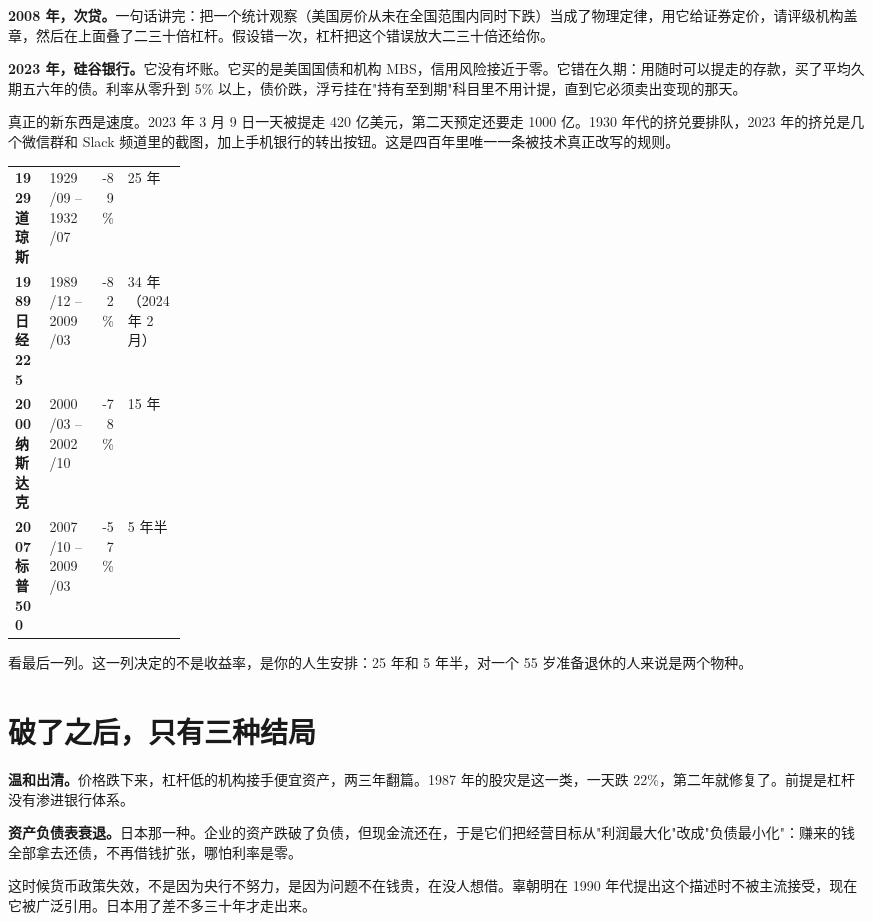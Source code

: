 \textbf{2008 年，次贷。}一句话讲完：把一个统计观察（美国房价从未在全国范围内同时下跌）当成了物理定律，用它给证券定价，请评级机构盖章，然后在上面叠了二三十倍杠杆。假设错一次，杠杆把这个错误放大二三十倍还给你。

\textbf{2023 年，硅谷银行。}它没有坏账。它买的是美国国债和机构 MBS，信用风险接近于零。它错在久期：用随时可以提走的存款，买了平均久期五六年的债。利率从零升到 5\% 以上，债价跌，浮亏挂在"持有至到期"科目里不用计提，直到它必须卖出变现的那天。

真正的新东西是速度。2023 年 3 月 9 日一天被提走 420 亿美元，第二天预定还要走 1000 亿。1930 年代的挤兑要排队，2023 年的挤兑是几个微信群和 Slack 频道里的截图，加上手机银行的转出按钮。这是四百年里唯一一条被技术真正改写的规则。

\begin{tablewrap}
\begin{xltabular}{\linewidth}{>{\raggedright\arraybackslash}p{0.20\linewidth}XrX}
\toprule
{} &  &  &  \\
\midrule
\textbf{1929 道琼斯} & 1929/09 – 1932/07 & -89\% & 25 年 \\
\textbf{1989 日经 225} & 1989/12 – 2009/03 & -82\% & 34 年（2024 年 2 月） \\
\textbf{2000 纳斯达克} & 2000/03 – 2002/10 & -78\% & 15 年 \\
\textbf{2007 标普 500} & 2007/10 – 2009/03 & -57\% & 5 年半 \\
\bottomrule
\end{xltabular}
\end{tablewrap}

看最后一列。这一列决定的不是收益率，是你的人生安排：25 年和 5 年半，对一个 55 岁准备退休的人来说是两个物种。

\bookbreak

\section{破了之后，只有三种结局}

\textbf{温和出清。}价格跌下来，杠杆低的机构接手便宜资产，两三年翻篇。1987 年的股灾是这一类，一天跌 22\%，第二年就修复了。前提是杠杆没有渗进银行体系。

\textbf{资产负债表衰退。}日本那一种。企业的资产跌破了负债，但现金流还在，于是它们把经营目标从"利润最大化"改成"负债最小化"：赚来的钱全部拿去还债，不再借钱扩张，哪怕利率是零。

这时候货币政策失效，不是因为央行不努力，是因为问题不在钱贵，在没人想借。辜朝明在 1990 年代提出这个描述时不被主流接受，现在它被广泛引用。日本用了差不多三十年才走出来。

